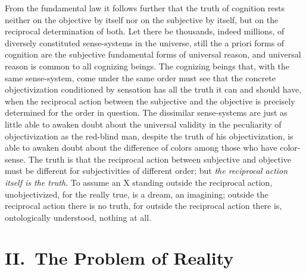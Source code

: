 \documentclass[12pt]{article}
\begin{document}
From the fundamental law it follows further that the truth of cognition
rests neither on the objective by itself nor on the subjective by itself,
but on the reciprocal determination of both. Let there be thousands,
indeed millions, of diversely constituted sense-systems in the universe,
still the a priori forms of cognition are the subjective fundamental forms
of universal reason, and universal reason is common to all cognizing
beings. The cognizing beings that, with the same sense-system, come under
the same
order must see that the concrete objectivization conditioned by sensation
has all the truth it can and should have, when the reciprocal action
between the subjective and the objective is precisely determined for the
order in question. The dissimilar sense-systems are just as little able to
awaken doubt about the universal validity in the peculiarity of
objectivization as the red-blind man, despite the truth of his
objectivization, is able to awaken doubt about the difference of colors
among those who have color-sense. The truth is that the reciprocal action
between subjective and objective must be different for subjectivities of
different order; but \emph{the reciprocal action itself is the truth}. To
assume an X standing outside the reciprocal action, unobjectivized, for the
really true, is a dream, an imagining; outside the reciprocal action there
is no truth, for outside the reciprocal action there is, ontologically
understood, nothing at all.


\section*{II.\ The Problem of Reality}
\label{sec:realitet}
\end{document}
